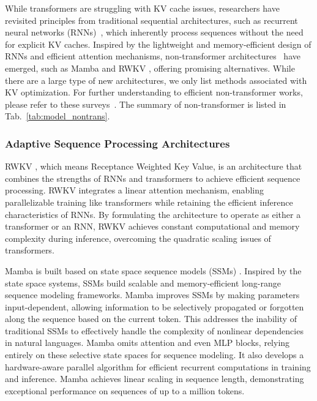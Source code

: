 While transformers are struggling with KV cache issues, researchers have revisited principles from traditional sequential architectures, such as recurrent neural networks (RNNs)~\cite{salehinejad2017recent}, which inherently process sequences without the need for explicit KV caches. 
Inspired by the lightweight and memory-efficient design of RNNs and efficient attention mechanisms,  non-transformer architectures~\cite{xu2024integrating, hasani2022liquid, smith2022simplified, wang2022pretraining,guMambaLinearTimeSequence2024,pengRWKVReinventingRNNs2023} have emerged, 
such as Mamba \cite{guMambaLinearTimeSequence2024} and RWKV \cite{pengRWKVReinventingRNNs2023}, offering promising alternatives. While there are a large type of new architectures, we only list methods associated with KV optimization. 
For further understanding to efficient non-transformer works, please refer to these surveys~\cite{zhou2024survey,xu2024survey,qu2024survey,patro2024mamba}.
The summary of non-transformer is listed in Tab.~\ref{tab:model_nontrans}.


\subsubsection{Adaptive Sequence Processing Architectures}\label{sec:model_nontrans_na}

RWKV \cite{pengRWKVReinventingRNNs2023}, which means Receptance Weighted Key Value, is an architecture that combines the strengths of RNNs and transformers to achieve efficient sequence processing. RWKV integrates a linear attention mechanism, enabling parallelizable training like transformers while retaining the efficient inference characteristics of RNNs. By formulating the architecture to operate as either a transformer or an RNN, RWKV achieves constant computational and memory complexity during inference, overcoming the quadratic scaling issues of transformers.

Mamba \cite{guMambaLinearTimeSequence2024} is built based on state space sequence models (SSMs) \cite{guParameterizationInitializationDiagonal2022, guCombiningRecurrentConvolutional2021}. Inspired by the state space systems, SSMs build scalable and memory-efficient long-range sequence modeling frameworks. Mamba improves SSMs by making parameters input-dependent, allowing information to be selectively propagated or forgotten along the sequence based on the current token. This addresses the inability of traditional SSMs to effectively handle the complexity of nonlinear dependencies in natural languages. Mamba omits attention and even MLP blocks, relying entirely on these selective state spaces for sequence modeling. It also develops a hardware-aware parallel algorithm for efficient recurrent computations in training and inference. Mamba achieves linear scaling in sequence length, demonstrating exceptional performance on sequences of up to a million tokens.

